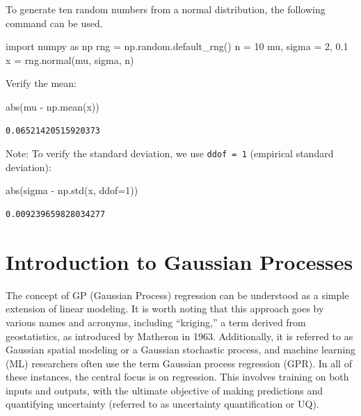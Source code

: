 \documentclass[
  letterpaper,
  DIV=11,
  numbers=noendperiod]{scrreprt}
\newenvironment{Shaded}{\begin{snugshade}}{\end{snugshade}}
\newcommand{\BuiltInTok}[1]{\textcolor[rgb]{0.00,0.23,0.31}{#1}}
\newcommand{\DecValTok}[1]{\textcolor[rgb]{0.68,0.00,0.00}{#1}}
\newcommand{\FloatTok}[1]{\textcolor[rgb]{0.68,0.00,0.00}{#1}}
\newcommand{\ImportTok}[1]{\textcolor[rgb]{0.00,0.46,0.62}{#1}}
\newcommand{\NormalTok}[1]{\textcolor[rgb]{0.00,0.23,0.31}{#1}}
\newcommand{\OperatorTok}[1]{\textcolor[rgb]{0.37,0.37,0.37}{#1}}
\begin{document}
To generate ten random numbers from a normal distribution, the following
command can be used.

\begin{Shaded}
\begin{Highlighting}[]
\ImportTok{import}\NormalTok{ numpy }\ImportTok{as}\NormalTok{ np}
\NormalTok{rng }\OperatorTok{=}\NormalTok{ np.random.default\_rng()}
\NormalTok{n }\OperatorTok{=} \DecValTok{10}
\NormalTok{mu, sigma }\OperatorTok{=} \DecValTok{2}\NormalTok{, }\FloatTok{0.1}
\NormalTok{x }\OperatorTok{=}\NormalTok{ rng.normal(mu, sigma, n)}
\end{Highlighting}
\end{Shaded}

Verify the mean:

\begin{Shaded}
\begin{Highlighting}[]
\BuiltInTok{abs}\NormalTok{(mu }\OperatorTok{{-}}\NormalTok{ np.mean(x))}
\end{Highlighting}
\end{Shaded}

\begin{verbatim}
0.06521420515920373
\end{verbatim}

Note: To verify the standard deviation, we use \texttt{ddof\ =\ 1}
(empirical standard deviation):

\begin{Shaded}
\begin{Highlighting}[]
\BuiltInTok{abs}\NormalTok{(sigma }\OperatorTok{{-}}\NormalTok{ np.std(x, ddof}\OperatorTok{=}\DecValTok{1}\NormalTok{))}
\end{Highlighting}
\end{Shaded}

\begin{verbatim}
0.009239659828034277
\end{verbatim}

\hypertarget{introduction-to-gaussian-processes}{%
\section{Introduction to Gaussian
Processes}\label{introduction-to-gaussian-processes}}

The concept of GP (Gaussian Process) regression can be understood as a
simple extension of linear modeling. It is worth noting that this
approach goes by various names and acronyms, including ``kriging,'' a
term derived from geostatistics, as introduced by Matheron in 1963.
Additionally, it is referred to as Gaussian spatial modeling or a
Gaussian stochastic process, and machine learning (ML) researchers often
use the term Gaussian process regression (GPR). In all of these
instances, the central focus is on regression. This involves training on
both inputs and outputs, with the ultimate objective of making
predictions and quantifying uncertainty (referred to as uncertainty
quantification or UQ).
\end{document}
